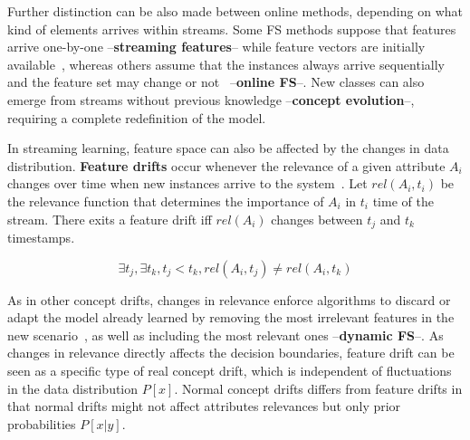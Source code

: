 \documentclass[preprint,12pt]{elsarticle}
\begin{document}
Further distinction can be also made between online methods, depending on what kind of elements arrives within streams. Some FS methods suppose that features arrive one-by-one --\textbf{streaming features}-- while feature vectors are initially available~\citep{wu10, eskandari16}, whereas others assume that the instances always arrive sequentially and the feature set may change or not~\cite{kata05} --\textbf{online FS}--. New classes can also emerge from streams without previous knowledge --\textbf{concept evolution}--, requiring a complete redefinition of the model.

In streaming learning, feature space can also be affected by the changes in data distribution. \textbf{Feature drifts} occur whenever the relevance of a given attribute $A_i$ changes over time when new instances arrive to the system~\cite{barddal15}. Let $rel(A_i, t_i)$ be the relevance function that determines the importance of $A_i$ in $t_i$ time of the stream. There exits a feature drift iff $rel(A_i)$ changes between $t_j$ and $t_k$ timestamps.

\begin{equation}\label{eq:rel}
\exists t_j, \exists t_k, t_j < t_k, rel(A_i, t_j) \neq rel(A_i, t_k)
\end{equation}

As in other concept drifts, changes in relevance enforce algorithms to discard or adapt the model already learned by removing the most irrelevant features in the new scenario~\cite{nguyen12}, as well as including the most relevant ones --\textbf{dynamic FS}--. As changes in relevance directly affects the decision boundaries, feature drift can be seen as a specific type of real concept drift, which is independent of fluctuations in the data distribution $P[x]$. Normal concept drifts differs from feature drifts in that normal drifts might not affect attributes relevances but only prior probabilities $P[x|y]$.
\end{document}

